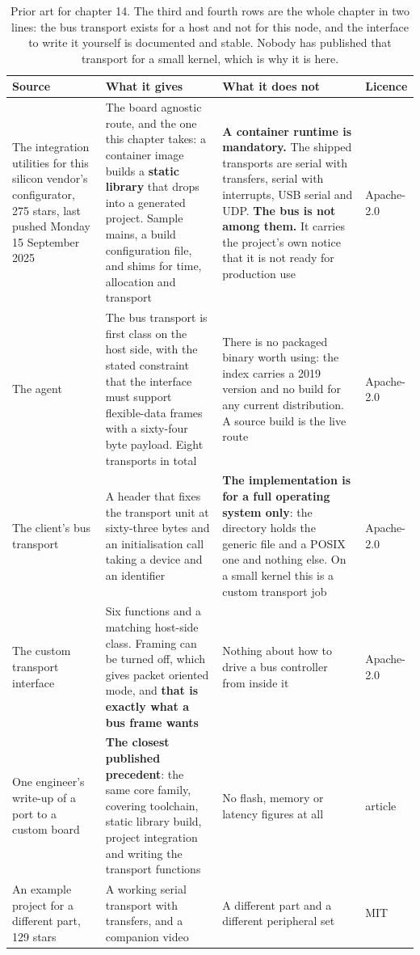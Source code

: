 \begin{table}[H]\centering\small
\begin{tabular}{p{34mm}p{46mm}p{38mm}p{20mm}}
\toprule
Source & What it gives & What it does not & Licence \\
\midrule
The integration utilities for this silicon vendor's configurator, 275 stars, last
pushed Monday 15 September 2025 & The board agnostic route, and the one this
chapter takes: a container image builds a \textbf{static library} that drops into
a generated project. Sample mains, a build configuration file, and shims for
time, allocation and transport & \textbf{A container runtime is mandatory.} The
shipped transports are serial with transfers, serial with interrupts, USB serial
and UDP. \textbf{The bus is not among them.} It carries the project's own notice
that it is not ready for production use & Apache-2.0 \\
The agent & The bus transport is first class on the host side, with the stated
constraint that the interface must support flexible-data frames with a
sixty-four byte payload. Eight transports in total & There is no packaged binary
worth using: the index carries a 2019 version and no build for any current
distribution. A source build is the live route & Apache-2.0 \\
The client's bus transport & A header that fixes the transport unit at sixty-three
bytes and an initialisation call taking a device and an identifier & \textbf{The
implementation is for a full operating system only}: the directory holds the
generic file and a POSIX one and nothing else. On a small kernel this is a
custom transport job & Apache-2.0 \\
The custom transport interface & Six functions and a matching host-side class.
Framing can be turned off, which gives packet oriented mode, and \textbf{that is
exactly what a bus frame wants} & Nothing about how to drive a bus controller
from inside it & Apache-2.0 \\
One engineer's write-up of a port to a custom board & \textbf{The closest
published precedent}: the same core family, covering toolchain, static library
build, project integration and writing the transport functions & No flash,
memory or latency figures at all & article \\
An example project for a different part, 129 stars & A working serial transport
with transfers, and a companion video & A different part and a different
peripheral set & MIT \\
\bottomrule
\end{tabular}
\caption{Prior art for chapter 14. The third and fourth rows are the whole chapter in two lines: the bus transport exists for a host and not for this node, and the interface to write it yourself is documented and stable. Nobody has published that transport for a small kernel, which is why it is here.}
\end{table}

